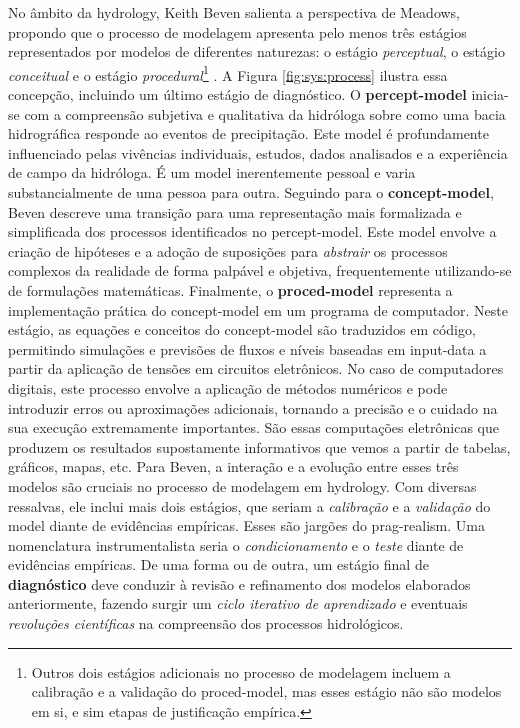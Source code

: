 \documentclass[./main.tex]{subfiles}
\begin{document}
\par No âmbito da \gls{hydrology}, Keith Beven salienta a perspectiva de Meadows, propondo que o processo de modelagem apresenta pelo menos três estágios representados por modelos de diferentes naturezas: o estágio \textit{perceptual}, o estágio \textit{conceitual} e o estágio \textit{procedural}\footnote{Outros dois estágios adicionais no processo de modelagem incluem a calibração e a validação do \gls{proced-model}, mas esses estágio não são modelos em si, e sim etapas de justificação empírica.} \cite{beven2011}. A Figura \ref{fig:sys:process} ilustra essa concepção, incluindo um último estágio de diagnóstico. O \textbf{\gls{percept-model}} inicia-se com a compreensão subjetiva e qualitativa da hidróloga sobre como uma bacia hidrográfica responde ao eventos de precipitação. Este \gls{model} é profundamente influenciado pelas vivências individuais, estudos, dados analisados e a experiência de campo da hidróloga. É um \gls{model} inerentemente pessoal e varia substancialmente de uma pessoa para outra. Seguindo para o \textbf{\gls{concept-model}}, Beven descreve uma transição para uma representação mais formalizada e simplificada dos processos identificados no \gls{percept-model}. Este \gls{model} envolve a criação de hipóteses e a adoção de suposições para \textit{abstrair} os processos complexos da realidade de forma palpável e objetiva, frequentemente utilizando-se de formulações matemáticas. Finalmente, o \textbf{\gls{proced-model}} representa a implementação prática do \gls{concept-model} em um programa de computador. Neste estágio, as equações e conceitos do \gls{concept-model} são traduzidos em código, permitindo simulações e previsões de fluxos e níveis baseadas em \gls{input-data} a partir da aplicação de tensões em circuitos eletrônicos. No caso de computadores digitais, este processo envolve a aplicação de métodos numéricos e pode introduzir erros ou aproximações adicionais, tornando a precisão e o cuidado na sua execução extremamente importantes. São essas computações eletrônicas que produzem os resultados supostamente informativos que vemos a partir de tabelas, gráficos, mapas, etc. Para Beven, a interação e a evolução entre esses três modelos são cruciais no processo de modelagem em \gls{hydrology}. Com diversas ressalvas, ele inclui mais dois estágios, que seriam a \textit{calibração} e a \textit{validação} do \gls{model} diante de evidências empíricas.  Esses são jargões do \gls{prag-realism}. Uma nomenclatura instrumentalista seria o \textit{condicionamento} e o \textit{teste} diante de evidências empíricas. De uma forma ou de outra, um estágio final de \textbf{diagnóstico} deve conduzir à revisão e refinamento dos modelos elaborados anteriormente, fazendo surgir um \textit{ciclo iterativo de aprendizado} e eventuais \textit{revoluções científicas} na compreensão dos processos hidrológicos.
\end{document}

